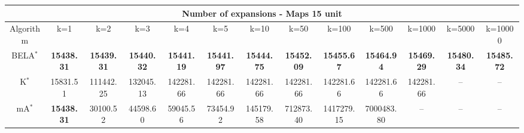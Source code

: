 \begin{tabular}{c|cccccccccccc}\toprule
\multicolumn{13}{c}{Number of expansions - Maps 15 unit}\\ \midrule
Algorithm & k=1 & k=2 & k=3 & k=4 & k=5 & k=10 & k=50 & k=100 & k=500 & k=1000 & k=5000 & k=10000 \\ \midrule
BELA$^*$ & \textbf{15438.31} & \textbf{15439.31} & \textbf{15440.32} & \textbf{15441.19} & \textbf{15441.97} & \textbf{15444.75} & \textbf{15452.09} & \textbf{15455.67} & \textbf{15464.94} & \textbf{15469.29} & \textbf{15480.34} & \textbf{15485.72} \\
K$^*$ & 15831.51 & 111442.25 & 132045.13 & 142281.66 & 142281.66 & 142281.66 & 142281.66 & 142281.66 & 142281.66 & 142281.66 & -- & -- \\
mA$^*$ & \textbf{15438.31} & 30100.52 & 44598.60 & 59045.56 & 73454.92 & 145179.58 & 712873.40 & 1417279.15 & 7000483.80 & -- & -- & -- \\ \bottomrule 
\end{tabular}
